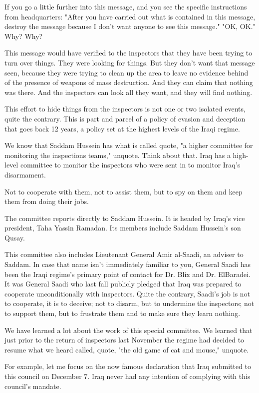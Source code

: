 \documentclass[10pt,a4paper]{article}
\begin{document}
If you go a little further into this message, and you see the specific instructions from headquarters: "After you have carried out what is contained in this message, destroy the message because I don't want anyone to see this message." "OK, OK." Why? Why?

This message would have verified to the inspectors that they have been trying to turn over things. They were looking for things. But they don't want that message seen, because they were trying to clean up the area to leave no evidence behind of the presence of weapons of mass destruction. And they can claim that nothing was there. And the inspectors can look all they want, and they will find nothing.

This effort to hide things from the inspectors is not one or two isolated events, quite the contrary. This is part and parcel of a policy of evasion and deception that goes back 12 years, a policy set at the highest levels of the Iraqi regime.

We know that Saddam Hussein has what is called quote, "a higher committee for monitoring the inspections teams," unquote. Think about that. Iraq has a high-level committee to monitor the inspectors who were sent in to monitor Iraq's disarmament.

Not to cooperate with them, not to assist them, but to spy on them and keep them from doing their jobs.

The committee reports directly to Saddam Hussein. It is headed by Iraq's vice president, Taha Yassin Ramadan. Its members include Saddam Hussein's son Qusay.

This committee also includes Lieutenant General Amir al-Saadi, an adviser to Saddam. In case that name isn't immediately familiar to you, General Saadi has been the Iraqi regime's primary point of contact for Dr. Blix and Dr. ElBaradei. It was General Saadi who last fall publicly pledged that Iraq was prepared to cooperate unconditionally with inspectors. Quite the contrary, Saadi's job is not to cooperate, it is to deceive; not to disarm, but to undermine the inspectors; not to support them, but to frustrate them and to make sure they learn nothing.

We have learned a lot about the work of this special committee. We learned that just prior to the return of inspectors last November the regime had decided to resume what we heard called, quote, "the old game of cat and mouse," unquote.

For example, let me focus on the now famous declaration that Iraq submitted to this council on December 7. Iraq never had any intention of complying with this council's mandate.
\end{document}
